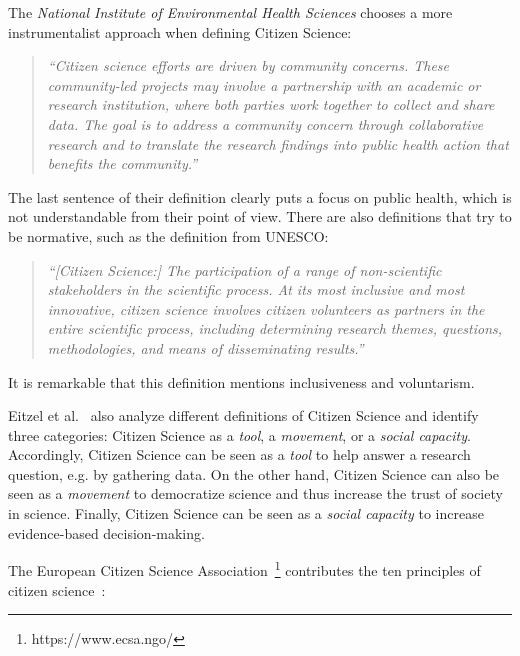 The \textit{National Institute of Environmental Health Sciences} chooses a more instrumentalist approach when defining Citizen Science:
\begin{quotation}
\textit{``Citizen science efforts are driven by community concerns. These community-led projects may involve a partnership with an academic or research institution, where both parties work together to collect and share data. The goal is to address a community concern through collaborative research and to translate the research findings into public health action that benefits the community.''~\cite{national2022community}}
\end{quotation}
The last sentence of their definition clearly puts a focus on public health, which is not understandable from their point of view.
There are also definitions that try to be normative, such as the definition from UNESCO:
\begin{quotation}
\textit{``[Citizen Science:] The participation of a range of non-scientific stakeholders in the scientific process. At its most inclusive and most innovative, citizen science involves citizen volunteers as partners in the entire scientific process, including determining research themes, questions, methodologies, and means of disseminating results.''~\cite{vohland2021science}}
\end{quotation}
It is remarkable that this definition mentions inclusiveness and voluntarism.

Eitzel et al.~\cite{eitzel2017citizen} also analyze different definitions of Citizen Science and identify three categories: Citizen Science as a \textit{tool}, a \textit{movement}, or a \textit{social capacity}.
Accordingly, Citizen Science can be seen as a \textit{tool} to help answer a research question, e.g. by gathering data.
On the other hand, Citizen Science can also be seen as a \textit{movement} to democratize science and thus increase the trust of society in science.
Finally, Citizen Science can be seen as a \textit{social capacity} to increase evidence-based decision-making.

The European Citizen Science Association~\footnote{https://www.ecsa.ngo/} contributes the ten principles of citizen science~\cite{ecsa2015ten}:

